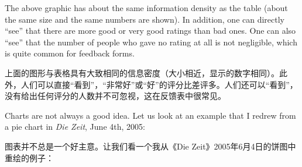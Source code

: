 \bigskip
The above graphic has about the same information density as the table (about
the same size and the same numbers are shown). In addition, one can directly
``see'' that there are more good or very good ratings than bad ones. One can
also ``see'' that the number of people who gave no rating at all is not
negligible, which is quite common for feedback forms.

上面的图形与表格具有大致相同的信息密度（大小相近，显示的数字相同）。此外，人们可以直接“看到”，“非常好”或“好”的评分比差评多。人们还可以“看到”，没有给出任何评分的人数并不可忽视，这在反馈表中很常见。

Charts are not always a good idea. Let us look at an example that I redrew from
a pie chart in \emph{Die Zeit}, June 4th, 2005:

图表并不总是一个好主意。让我们看一个我从《Die Zeit》2005年6月4日的饼图中重绘的例子：

